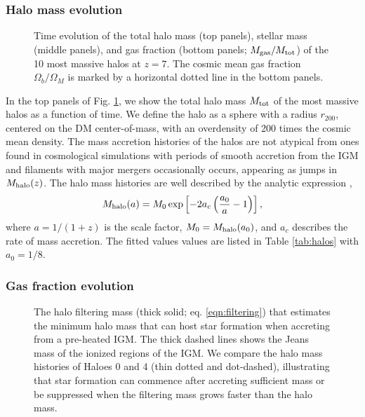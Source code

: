 \documentclass[useAMS,usenatbib]{mn2e}
\begin{document}

\subsubsection{Halo mass evolution}

\begin{figure}
  \caption{\label{fig:massevo} Time evolution of the total halo mass
    (top panels), stellar mass (middle panels), and gas fraction
    (bottom panels; $M_{\rm gas} / M_{\rm tot}$) of the 10 most
    massive halos at $z=7$.  The cosmic mean gas fraction $\Omega_b /
    \Omega_M$ is marked by a horizontal dotted line in the bottom
    panels.}
\end{figure}

In the top panels of Fig. \ref{fig:massevo}, we show the total halo
mass $M_{\rm tot}$ of the most massive halos as a function of time.
We define the halo as a sphere with a radius $r_{200}$, centered on
the DM center-of-mass, with an overdensity of 200 times the cosmic
mean density.  The mass accretion histories of the halos are not
atypical from ones found in cosmological simulations with periods of
smooth accretion from the IGM and filaments with major mergers
occasionally occurs, appearing as jumps in $M_{\rm halo}(z)$.  The
halo mass histories are well described by the analytic expression
\citep{Wechsler02},
%
\begin{equation}
  \label{eqn:mhalo}
  M_{\rm halo}(a) = M_0 \exp \left[-2a_c\left(\frac{a_0}{a} -
    1\right)\right],
\end{equation}
%
where $a = 1/(1+z)$ is the scale factor, $M_0 = M_{\rm halo}(a_0)$,
and $a_c$ describes the rate of mass accretion.  The fitted values
values are listed in Table \ref{tab:halos} with $a_0 = 1/8$.

\subsubsection{Gas fraction evolution}
\label{sec:fgas}

\begin{figure}
  \caption{\label{fig:filtering} The halo filtering mass (thick solid;
    eq. \ref{eqn:filtering}) that estimates the minimum halo mass that
    can host star formation when accreting from a pre-heated IGM.  The
    thick dashed lines shows the Jeans mass of the ionized regions of
    the IGM.  We compare the halo mass histories of Haloes 0 and 4
    (thin dotted and dot-dashed), illustrating that star formation can
    commence after accreting sufficient mass or be suppressed when the
    filtering mass grows faster than the halo mass.}
\end{figure}
\end{document}
